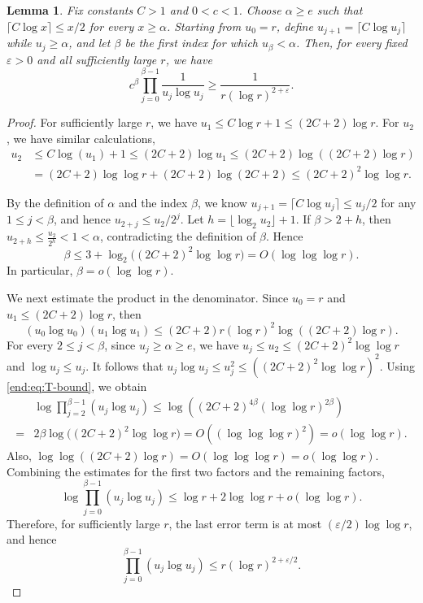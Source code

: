 \documentclass[12pt,a4paper]{article}
\numberwithin{equation}{section}
\newtheorem{lemma}[theorem]{Lemma}
\theoremstyle{definition}
\theoremstyle{remark}
\begin{document}
\begin{lemma}\label{end:lem:product} 
Fix constants $C>1$ and $0<c<1$.  Choose $\alpha\geq e$ such that
$\lceil C\log x\rceil\le x/2$ for every $x\ge \alpha$.  Starting from $u_0=r$, define
$u_{j+1}=\lceil C\log u_j\rceil$ while $u_j\ge \alpha$, and let $\beta$ be the first index for which $u_\beta<\alpha$.  Then, for every fixed $\varepsilon>0$ and all sufficiently large $r$, we have
$$ c^\beta\prod_{j=0}^{\beta-1}\frac1{u_j\log u_j}
 \ge\frac1{r(\log r)^{2+\varepsilon}}.$$
\end{lemma}

\begin{proof}
For sufficiently large $r$, we have
$u_1\le C\log r+1\le(2C+2)\log r$.
For $u_2$, we have similar calculations, 
\begin{align*}
  u_2&\le C\log(u_1)+1\le (2C+2)\log u_1\le (2C+2)\log ((2C+2)\log r) \\
 &=(2C+2)\log \log r+(2C+2)\log (2C+2)\le (2C+2)^2\log \log r.
\end{align*}

By the definition of $\alpha$ and the index $\beta$, we know $u_{j+1}=\lceil C\log u_j\rceil \le u_j/2$ for any $1\le j<\beta $, and hence $u_{2+j}\le u_2/2^j$.
Let $h=\lfloor\log_2u_2\rfloor+1$.  If  $\beta >2+h$, then   $u_{2+h}\le \frac{u_2}{2^h}<1<\alpha$, contradicting the definition of $\beta$. Hence
\begin{equation}\label{end:eq:T-bound}
 \beta\le3+\log_2\big((2C+2)^2\log\log r\big)
 =O(\log\log\log r).
\end{equation}
In particular, $\beta=o(\log\log r)$.

We next estimate the product in the denominator.  Since $u_0=r$ and
$u_1\le(2C+2)\log r$, then
$$ (u_0\log u_0)(u_1\log u_1)
 \le(2C+2)r(\log r)^2\log((2C+2)\log r).$$
For every $2\le j<\beta$,  since $u_j\ge \alpha\ge e$, we have
$u_j\le u_2\le(2C+2)^2\log\log r$ and
$\log u_j\le u_j$.  It follows that
$u_j\log u_j\le u_j^2\le((2C+2)^2\log\log r)^2$.
Using \eqref{end:eq:T-bound}, we obtain
\begin{align*}
 &\log\prod_{j=2}^{\beta-1}(u_j\log u_j)
\le \log((2C+2)^{4\beta}(\log\log r)^{2\beta})\\
=&2\beta\log\big((2C+2)^2\log\log r\big)
 =O((\log\log\log r)^2)
 =o(\log\log r).   
\end{align*}
Also,
$\log\log((2C+2)\log r)=O(\log\log\log r)=o(\log\log r)$.
Combining the estimates for the first two factors and the remaining factors,
$$ \log\prod_{j=0}^{\beta-1}(u_j\log u_j)
 \le\log r+2\log\log r+o(\log\log r).$$
Therefore, for sufficiently large $r$, the last error term is at most
$(\varepsilon/2)\log\log r$, and hence
\begin{equation}\label{end:eq:prod-upper}
 \prod_{j=0}^{\beta-1}(u_j\log u_j)
 \le r(\log r)^{2+\varepsilon/2}.
\end{equation}


\end{proof}
\end{document}
